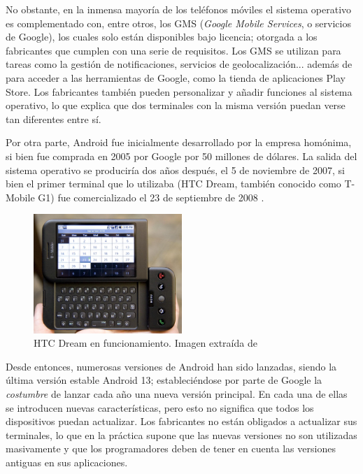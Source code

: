             No obstante, en la inmensa mayoría de los teléfonos móviles el sistema operativo es complementado con,
            entre otros, los GMS (\textit{Google Mobile Services}, o servicios de Google), los cuales solo están 
            disponibles bajo licencia; otorgada a los fabricantes que cumplen con una serie de requisitos. Los GMS 
            se utilizan para tareas como la gestión de notificaciones, servicios de geolocalización... además de para 
            acceder a las herramientas de Google, como la tienda de aplicaciones Play Store. Los fabricantes también 
            pueden personalizar y añadir funciones al sistema operativo, lo que explica que dos terminales con la misma 
            versión puedan verse tan diferentes entre sí. \newline
            

            Por otra parte, Android fue inicialmente desarrollado por la empresa homónima, si bien fue comprada en 2005
            por Google por 50 millones de dólares. La salida del sistema operativo se produciría dos años después, el 5 
            de noviembre de 2007, si bien el primer terminal que lo utilizaba (HTC Dream, también conocido como 
            T-Mobile G1) fue comercializado el 23 de septiembre de 2008 \cite{adeva_android_2023} \cite{marquez_asi_2022}.

            \begin{figure}[h]
                \centering
                \includegraphics[width=0.5\textwidth]{figures/HTC Dream.jpg}
                \caption[HTC Dream en funcionamiento.]{HTC Dream en funcionamiento. Imagen extraída de \cite{oryl_t-mobile_2008}}
                \label{figure:android:htc_dream}
            \end{figure}

            Desde entonces, numerosas versiones de Android han sido lanzadas, siendo la última versión estable Android 
            13; estableciéndose por parte de Google la \textit{costumbre} de lanzar cada año una nueva versión principal. 
            En cada una de ellas se introducen nuevas características, pero esto no significa que todos los dispositivos 
            puedan actualizar. Los fabricantes no están obligados a actualizar sus terminales, lo que en la práctica 
            supone que las nuevas versiones no son utilizadas masivamente y que los programadores deben de tener en 
            cuenta las versiones antiguas en sus aplicaciones. 
            \newline

